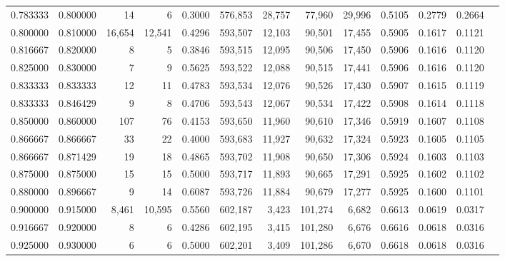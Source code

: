 \begin{tabular}{rrrrrrrrrrrrr}
0.783333 & 0.800000 &     14 &      6 &                                     0.3000 & 576,853 &  28,757 &  77,960 &  29,996 & 0.5105 & 0.2779 & 0.2664 \\
0.800000 & 0.810000 & 16,654 & 12,541 &                                     0.4296 & 593,507 &  12,103 &  90,501 &  17,455 & 0.5905 & 0.1617 & 0.1121 \\
0.816667 & 0.820000 &      8 &      5 &                                     0.3846 & 593,515 &  12,095 &  90,506 &  17,450 & 0.5906 & 0.1616 & 0.1120 \\
0.825000 & 0.830000 &      7 &      9 &                                     0.5625 & 593,522 &  12,088 &  90,515 &  17,441 & 0.5906 & 0.1616 & 0.1120 \\
0.833333 & 0.833333 &     12 &     11 &                                     0.4783 & 593,534 &  12,076 &  90,526 &  17,430 & 0.5907 & 0.1615 & 0.1119 \\
0.833333 & 0.846429 &      9 &      8 &                                     0.4706 & 593,543 &  12,067 &  90,534 &  17,422 & 0.5908 & 0.1614 & 0.1118 \\
0.850000 & 0.860000 &    107 &     76 &                                     0.4153 & 593,650 &  11,960 &  90,610 &  17,346 & 0.5919 & 0.1607 & 0.1108 \\
0.866667 & 0.866667 &     33 &     22 &                                     0.4000 & 593,683 &  11,927 &  90,632 &  17,324 & 0.5923 & 0.1605 & 0.1105 \\
0.866667 & 0.871429 &     19 &     18 &                                     0.4865 & 593,702 &  11,908 &  90,650 &  17,306 & 0.5924 & 0.1603 & 0.1103 \\
0.875000 & 0.875000 &     15 &     15 &                                     0.5000 & 593,717 &  11,893 &  90,665 &  17,291 & 0.5925 & 0.1602 & 0.1102 \\
0.880000 & 0.896667 &      9 &     14 &                                     0.6087 & 593,726 &  11,884 &  90,679 &  17,277 & 0.5925 & 0.1600 & 0.1101 \\
0.900000 & 0.915000 &  8,461 & 10,595 &                                     0.5560 & 602,187 &   3,423 & 101,274 &   6,682 & 0.6613 & 0.0619 & 0.0317 \\
0.916667 & 0.920000 &      8 &      6 &                                     0.4286 & 602,195 &   3,415 & 101,280 &   6,676 & 0.6616 & 0.0618 & 0.0316 \\
0.925000 & 0.930000 &      6 &      6 &                                     0.5000 & 602,201 &   3,409 & 101,286 &   6,670 & 0.6618 & 0.0618 & 0.0316 \\

\end{tabular}
